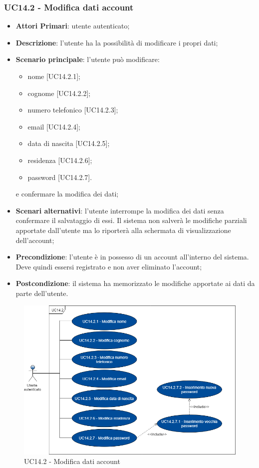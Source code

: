 \subsubsection{UC14.2 - Modifica dati account}
\begin{itemize}
	\item \textbf{Attori Primari}: utente autenticato;
	\item \textbf{Descrizione}: l'utente ha la possibilità di modificare i propri dati;
	\item \textbf{Scenario principale}: l'utente può modificare:
	\begin{itemize}
		\item nome [UC14.2.1];
		\item cognome [UC14.2.2];
		\item numero telefonico [UC14.2.3];
		\item email [UC14.2.4];
		\item data di nascita [UC14.2.5];
		\item residenza [UC14.2.6];
		\item password [UC14.2.7].
	\end{itemize}
	e confermare la modifica dei dati;
	\item \textbf{Scenari alternativi}: l'utente interrompe la modifica dei dati senza confermare il salvataggio di essi. Il sistema non salverà le modifiche parziali apportate dall'utente ma lo riporterà alla schermata di visualizzazione dell'account;	 
	\item \textbf{Precondizione}: l'utente è in possesso di un account all'interno del sistema. Deve quindi essersi registrato e non aver eliminato l'account;
	\item \textbf{Postcondizione}: il sistema ha memorizzato le modifiche apportate ai dati da parte dell’utente.
\end{itemize}
\begin{figure}[h]
	\includegraphics[width=14cm]{res/images/UC14-1Modifica.png}
	\centering
	\caption{UC14.2 - Modifica dati account}
\end{figure}
\newpage 
